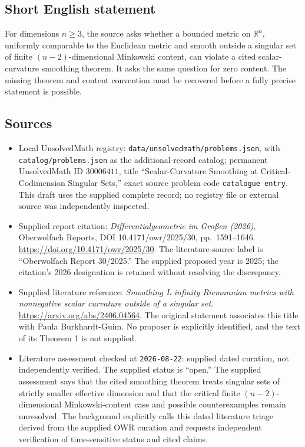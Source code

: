 \documentclass[11pt]{article}
\newcommand{\R}{\mathbb{R}}
\begin{document}
\subsection{Short English statement}
For dimensions \(n\geq3\), the source asks whether a bounded metric on \(\R^n\), uniformly comparable to the Euclidean metric and smooth outside a singular set of finite \((n-2)\)-dimensional Minkowski content, can violate a cited scalar-curvature smoothing theorem. It asks the same question for zero content. The missing theorem and content convention must be recovered before a fully precise statement is possible.
\subsection{Sources}
\begin{itemize}
\item Local UnsolvedMath registry: \texttt{data/unsolvedmath/problems.json}, with \texttt{catalog/problems.json} as the additional-record catalog; permanent UnsolvedMath ID \(30006411\), title ``Scalar-Curvature Smoothing at Critical-Codimension Singular Sets,'' exact source problem code \texttt{catalogue entry}. This draft uses the supplied complete record; no registry file or external source was independently inspected.
\item Supplied report citation: \emph{Differentialgeometrie im Großen (2026)}, Oberwolfach Reports, DOI 10.4171/owr/2025/30, pp.\ 1591--1646. \url{https://doi.org/10.4171/owr/2025/30}. The literature-source label is ``Oberwolfach Report 30/2025.'' The supplied proposed year is 2025; the citation's 2026 designation is retained without resolving the discrepancy.
\item Supplied literature reference: \emph{Smoothing L infinity Riemannian metrics with nonnegative scalar curvature outside of a singular set}. \url{https://arxiv.org/abs/2406.04564}. The original statement associates this title with Paula Burkhardt-Guim. No proposer is explicitly identified, and the text of its Theorem 1 is not supplied.
\item Literature assessment checked at \texttt{2026-08-22}: supplied dated curation, not independently verified. The supplied status is ``open.'' The supplied assessment says that the cited smoothing theorem treats singular sets of strictly smaller effective dimension and that the critical finite \((n-2)\)-dimensional Minkowski-content case and possible counterexamples remain unresolved. The background explicitly calls this dated literature triage derived from the supplied OWR curation and requests independent verification of time-sensitive status and cited claims.
\end{itemize}
\end{document}

